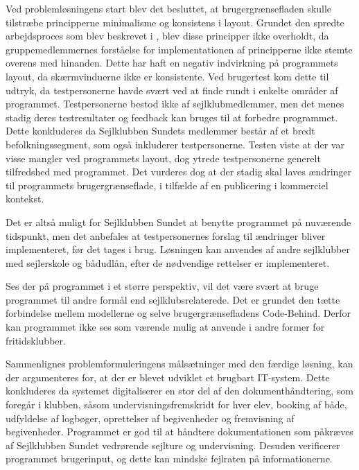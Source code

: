 Ved problemløsningens start blev det besluttet, at brugergrænsefladen skulle tilstræbe principperne minimalisme og konsistens i layout.
Grundet den spredte arbejdsproces som blev beskrevet i , blev disse principper ikke overholdt, da gruppemedlemmernes forståelse for implementationen af principperne ikke stemte overens med hinanden.
Dette har haft en negativ indvirkning på programmets layout, da skærmvinduerne ikke er konsistente.
Ved brugertest kom dette til udtryk, da testpersonerne havde svært ved at finde rundt i enkelte områder af programmet. 
Testpersonerne bestod ikke af sejlklubmedlemmer, men det menes stadig deres testresultater og feedback kan bruges til at forbedre programmet.
Dette konkluderes da Sejlklubben Sundets medlemmer består af et bredt befolkningssegment, som også inkluderer testpersonerne.
Testen viste at der var visse mangler ved programmets layout, dog ytrede testpersonerne generelt tilfredshed med programmet.
Det vurderes dog at der stadig skal laves ændringer til programmets brugergrænseflade, i tilfælde af en publicering i kommerciel kontekst. 

Det er altså muligt for Sejlklubben Sundet at benytte programmet på nuværende tidspunkt, men det anbefales at testpersonernes forslag til ændringer bliver implementeret, før det tages i brug.
Løsningen kan anvendes af andre sejlklubber med sejlerskole og bådudlån, efter de nødvendige rettelser er implementeret. 

Ses der på programmet i et større perspektiv, vil det være svært at bruge programmet til andre formål end sejlklubsrelaterede. 
Det er grundet den tætte forbindelse mellem modellerne og selve brugergrænsefladens Code-Behind. 
Derfor kan programmet ikke ses som værende mulig at anvende i andre former for fritidsklubber. 

Sammenlignes problemformuleringens målsætninger med den færdige løsning, kan der argumenteres for, at der er blevet udviklet et brugbart IT-system. 
Dette konkluderes da systemet digitaliserer en stor del af den dokumenthåndtering, som foregår i klubben, såsom undervisningsfremskridt for hver elev, booking af både, udfyldelse af logbøger, oprettelser af begivenheder og fremvisning af begivenheder.
Programmet er god til at håndtere dokumentationen som påkræves af Sejlklubben Sundet vedrørende sejlture og undervisning.
Desuden verificerer programmet brugerinput, og dette kan mindske fejlraten på informationerne.